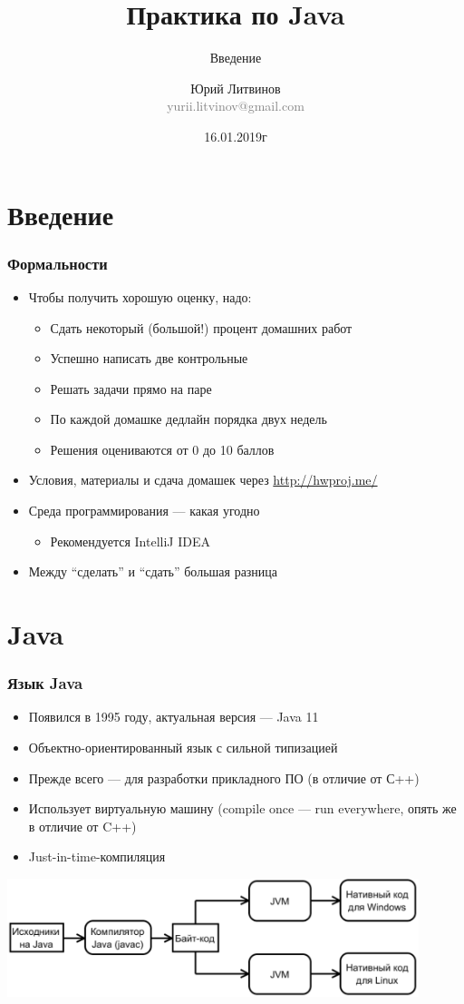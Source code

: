 \documentclass[xetex,mathserif,serif]{beamer}
\title{Практика по Java}
\subtitle{Введение}
\author[Юрий Литвинов]{Юрий Литвинов\\\small{\textcolor{gray}{yurii.litvinov@gmail.com}}}
\date{16.01.2019г}
\begin{document}
	\frame{\titlepage}

	\section{Введение}

	\begin{frame}
		\frametitle{Формальности}
		\begin{itemize}
			\item Чтобы получить хорошую оценку, надо:
			\begin{itemize}
				\item Сдать некоторый (большой!) процент домашних работ
				\item Успешно написать две контрольные
				\item Решать задачи прямо на паре
				\item По каждой домашке дедлайн порядка двух недель
				\item Решения оцениваются от 0 до 10 баллов
			\end{itemize}
			\item Условия, материалы и сдача домашек через \url{http://hwproj.me/}
			\item Среда программирования --- какая угодно
			\begin{itemize}
				\item Рекомендуется IntelliJ IDEA
			\end{itemize}
			\item Между ``сделать'' и ``сдать'' большая разница
		\end{itemize}
	\end{frame}

	\section{Java}

	\begin{frame}
		\frametitle{Язык Java}
		\begin{itemize}
			\item Появился в 1995 году, актуальная версия --- Java 11
			\item Объектно-ориентированный язык с сильной типизацией
			\item Прежде всего --- для разработки прикладного ПО (в отличие от С++)
			\item Использует виртуальную машину (compile once --- run everywhere, опять же в отличие от C++)
			\item Just-in-time-компиляция
		\end{itemize}
		\begin{center}
			\includegraphics[width=0.9\textwidth]{javaCompiling.png}
		\end{center}
	\end{frame}
\end{document}
